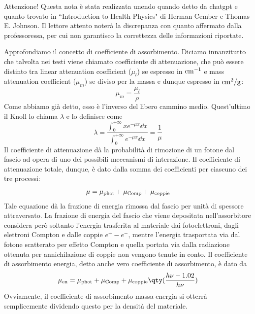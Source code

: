\begin{approfondimento}
    \footnotesize Attenzione! Questa nota è stata realizzata unendo quando detto da chatgpt e quanto trovato in ``Introduction to Health Physics" di Herman Cember e Thomas E. Johnson. Il lettore attento noterà la discrepanza con quanto affermato dalla professoressa, per cui non garantisco la correttezza delle informazioni riportate.
    
    Approfondiamo il concetto di coefficiente di assorbimento. Diciamo innanzitutto che talvolta nei testi viene chiamato coefficiente di attenuazione, che può essere distinto tra linear attenuation coefficient ($\mu_l$) se espresso in $\rm cm^{-1}$ e mass attenuation coefficient ($\mu_m$) se diviso per la massa e dunque espresso in $\rm cm^2/g$:
    \begin{equation*}
        \mu_{m}=\frac{\mu_l}{\rho}
    \end{equation*}
    Come abbiamo già detto, esso è l'inverso del libero cammino medio. Quest'ultimo il Knoll lo chiama $\lambda$ e lo definisce come
    \begin{equation*}
        \lambda
        =\frac{\int_{0}^{+\infty} xe^{-\mu x} \dd{x}}{\int_{0}^{+\infty} e^{-\mu x} \dd{x}}
        =\frac{1}{\mu}
    \end{equation*}
    Il coefficiente di attenuazione dà la probabilità di rimozione di un fotone dal fascio ad opera di uno dei possibili meccanismi di interazione. Il coefficiente di attenuazione totale, dunque, è dato dalla somma dei coefficienti per ciascuno dei tre processi:
    \begin{equation*}
        \mu=\mu_{\rm phot} + \mu_{\rm Comp} + \mu_{\rm coppie}
    \end{equation*}
    Tale equazione dà la frazione di energia rimossa dal fascio per unità di spessore attraversato. La frazione di energia del fascio che viene depositata nell'assorbitore considera però soltanto l'energia trasferita al materiale dai fotoelettroni, dagli elettroni Compton e dalle coppie $e^+ - e^-$, mentre l'energia trasportata via dal fotone scatterato per effetto Compton e quella portata via dalla radiazione ottenuta per annichilazione di coppie non vengono tenute in conto. Il coefficiente di assorbimento energia, detto anche vero coefficiente di assorbimento, è dato da
    \begin{equation*}
        \mu_{\rm en}
        =\mu_{\rm phot} + \mu_{\rm Comp} + \mu_{\rm coppie} \qty( \frac{h \nu - 1.02}{h\nu} )
    \end{equation*}
    Ovviamente, il coefficiente di assorbimento massa energia si otterrà semplicemente dividendo questo per la densità del materiale.


\end{approfondimento}
